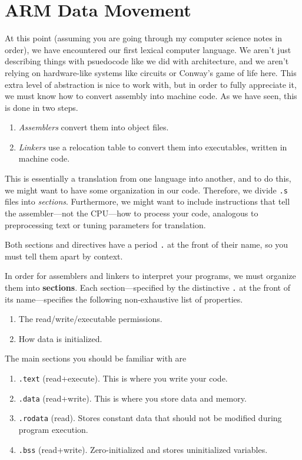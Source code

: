 \section{ARM Data Movement} 

  At this point (assuming you are going through my computer science notes in order), we have encountered our first lexical computer language. We aren't just describing things with psuedocode like we did with architecture, and we aren't relying on hardware-like systems like circuits or Conway's game of life here. This extra level of abstraction is nice to work with, but in order to fully appreciate it, we must know how to convert assembly into machine code. As we have seen, this is done in two steps. 
  \begin{enumerate}
    \item \textit{Assemblers} convert them into object files. 
    \item \textit{Linkers} use a relocation table to convert them into executables, written in machine code. 
  \end{enumerate} 
  This is essentially a translation from one language into another, and to do this, we might want to have some organization in our code. Therefore, we divide \texttt{.s} files into \textit{sections}. Furthermore, we might want to include instructions that tell the assembler---not the CPU---how to process your code, analogous to preprocessing text or tuning parameters for translation. 

  Both sections and directives have a period \texttt{.} at the front of their name, so you must tell them apart by context. 

  \begin{definition}[Section]
    \label{def:section}
    In order for assemblers and linkers to interpret your programs, we must organize them into \textbf{sections}. Each section---specified by the distinctive \texttt{.} at the front of its name---specifies the following non-exhaustive list of properties. 
    \begin{enumerate}
      \item The read/write/executable permissions. 
      \item How data is initialized. 
    \end{enumerate}
  \end{definition} 

  \begin{example}
    \label{ex:must-know-sections}
    The main sections you should be familiar with are 
    \begin{enumerate}
      \item \texttt{.text} (read+execute). This is where you write your code. 
      \item \texttt{.data} (read+write). This is where you store data and memory. 
      \item \texttt{.rodata} (read). Stores constant data that should not be modified during program execution. 
      \item \texttt{.bss} (read+write). Zero-initialized and stores uninitialized variables. 
    \end{enumerate}
  \end{example} 

